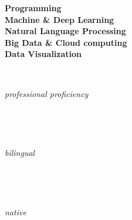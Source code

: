 



\divider\smallskip

\textbf{Programming}\\
\textbf{Machine \& Deep Learning}\\
\textbf{Natural Language Processing}\\

\textbf{Big Data \& Cloud computing}{}\\
\textbf{Data Visualization}{}\\





\begin{minipage}{0.0in}
\textbf{{\color{black}{English}}} \\
\end{minipage}
\hfill
\begin{minipage}{1.8in}
\textit{{professional proficiency}} \\[0pt]
\end{minipage}
\\[-10pt]
\begin{minipage}{0.0in}
\textbf{{\color{black}{French}}} \\
\end{minipage}
\hfill
\begin{minipage}{1.8in}
\textit{{bilingual}}  \\[0pt]
\end{minipage}
\\[-10pt]
\begin{minipage}{0.0in}
\textbf{{\color{black}{Arabic}}} \\
\end{minipage}
\hfill
\begin{minipage}{1.8in}
\textit{{native}} \\
\end{minipage}
\\[-10pt]

